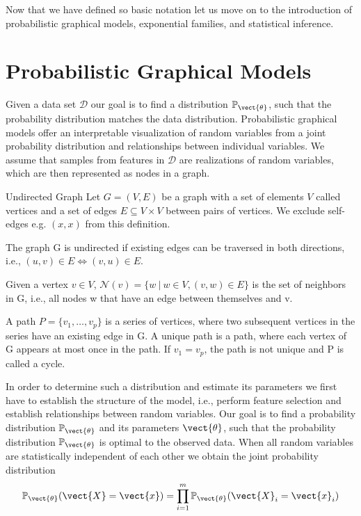     Now that we have defined so basic notation let us move on to the introduction of probabilistic graphical models, exponential families, and statistical inference.


\section{Probabilistic Graphical Models}
\label{sec:pgm}
Given a data set $\mathcal{D}$ our goal is to find a distribution $\mathbb{P}_{\vect{\theta}}$, such that the probability distribution matches the data distribution.
Probabilistic graphical models offer an interpretable visualization of random variables from a joint probability distribution and relationships between individual variables.
We assume that samples from features in $\mathcal{D}$ are realizations of random variables, which are then represented as nodes in a graph.
    \begin{definition}{Undirected Graph}
        Let $G=(V,E)$ be a graph with a set of elements $V$ called vertices and a set of edges $E \subseteq V \times V$ between pairs of vertices. 
        We exclude self-edges e.g. $(x,x)$ from this definition.

        The graph G is undirected if existing edges can be traversed in both directions, i.e., $(u,v) \in E \Leftrightarrow (v,u) \in E$.

        Given a vertex $v \in V$, $\mathcal{N}(v) = \{w \:\lvert\: w \in V, (v,w) \in E\}$ is the set of neighbors in G, i.e., all nodes w that have an edge between themselves and v.

        A path $P = \{v_1, \ldots, v_p\}$ is a series of vertices, where two subsequent vertices in the series have an existing edge in G. 
        A unique path is a path, where each vertex of G appears at most once in the path.
        If $v_1 = v_p$, the path is not unique and P is called a cycle.
    \end{definition}
In order to determine such a distribution and estimate its parameters we first have to establish the structure of the model, i.e., perform feature selection and establish relationships between random variables.
Our goal is to find a probability distribution $\mathbb{P}_{\vect{\theta}}$ and its parameters $\vect{\theta}$, such that the probability distribution $\mathbb{P}_{\vect{\theta}}$ is optimal \wrt to the observed data.
When all random variables are statistically independent of each other  we obtain the joint probability distribution
\begin{equation}
    \mathbb{P}_{\vect{\theta}}(\vect{X} = \vect{x}) = \prod_{i=1}^m \mathbb{P}_{\vect{\theta}}(\vect{X}_i = \vect{x}_i)
\end{equation}
